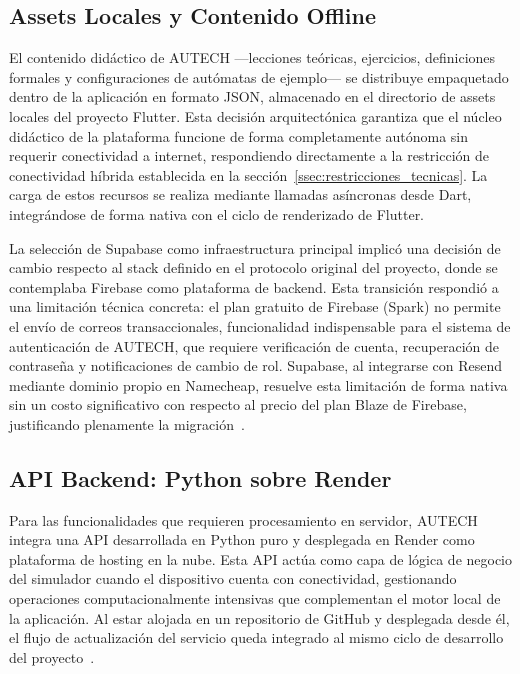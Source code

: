 \newpage
\subsection{Assets Locales y Contenido Offline}
\label{ssec:assets_offline}

El contenido didáctico de AUTECH ---lecciones teóricas, ejercicios, definiciones formales y
configuraciones de autómatas de ejemplo--- se distribuye empaquetado dentro de la aplicación
en formato JSON, almacenado en el directorio de assets locales del proyecto Flutter. Esta
decisión arquitectónica garantiza que el núcleo didáctico de la plataforma funcione de forma
completamente autónoma sin requerir conectividad a internet, respondiendo directamente a la
restricción de conectividad híbrida establecida en la
sección~\ref{ssec:restricciones_tecnicas}. La carga de estos recursos se realiza mediante
llamadas asíncronas desde Dart, integrándose de forma nativa con el ciclo de renderizado de
Flutter.

La selección de Supabase como infraestructura principal implicó una decisión de cambio respecto
al stack definido en el protocolo original del proyecto, donde se contemplaba Firebase como
plataforma de backend. Esta transición respondió a una limitación técnica concreta: el plan
gratuito de Firebase (Spark) no permite el envío de correos transaccionales, funcionalidad
indispensable para el sistema de autenticación de AUTECH, que requiere verificación de cuenta,
recuperación de contraseña y notificaciones de cambio de rol. Supabase, al integrarse con
Resend mediante dominio propio en Namecheap, resuelve esta limitación de forma nativa sin un
costo significativo con respecto al precio del plan Blaze de Firebase, justificando plenamente
la migración~\cite{supabase2024}.

\subsection{API Backend: Python sobre Render}
\label{ssec:api_backend}

Para las funcionalidades que requieren procesamiento en servidor, AUTECH integra una API
desarrollada en Python puro y desplegada en Render como plataforma de hosting en la nube. Esta
API actúa como capa de lógica de negocio del simulador cuando el dispositivo cuenta con
conectividad, gestionando operaciones computacionalmente intensivas que complementan el motor
local de la aplicación. Al estar alojada en un repositorio de GitHub y desplegada desde él,
el flujo de actualización del servicio queda integrado al mismo ciclo de desarrollo del
proyecto~\cite{pressman2020}.

